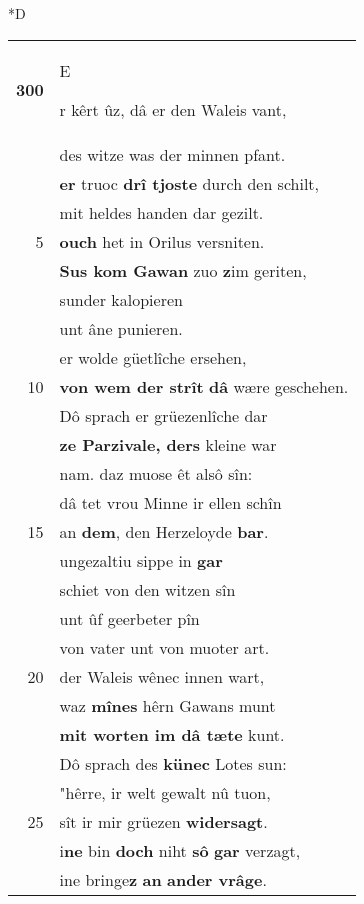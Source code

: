 \documentclass[8pt,a4paper,notitlepage]{article}
\begin{document}
\begin{table}[ht]
\begin{minipage}[t]{0.5\linewidth}
\small
\begin{center}*D
\end{center}
\begin{tabular}{rl}
\textbf{300} & \begin{large}E\end{large}r kêrt ûz, dâ er den Waleis vant,\\ 
 & des witze was der minnen pfant.\\ 
 & \textbf{er} truoc \textbf{drî tjoste} durch den schilt,\\ 
 & mit heldes handen dar gezilt.\\ 
5 & \textbf{ouch} het in Orilus versniten.\\ 
 & \textbf{Sus kom Gawan} zuo \textbf{z}im geriten,\\ 
 & sunder kalopieren\\ 
 & unt âne punieren.\\ 
 & er wolde güetlîche ersehen,\\ 
10 & \textbf{von wem der strît} \textbf{dâ} wære geschehen.\\ 
 & Dô sprach er grüezenlîche dar\\ 
 & \textbf{ze Parzivale, der}\textbf{s} kleine war\\ 
 & nam. daz muose êt alsô sîn:\\ 
 & dâ tet vrou Minne ir ellen schîn\\ 
15 & an \textbf{dem}, den Herzeloyde \textbf{bar}.\\ 
 & ungezaltiu sippe in \textbf{gar}\\ 
 & schiet von den witzen sîn\\ 
 & unt ûf geerbeter pîn\\ 
 & von vater unt von muoter art.\\ 
20 & der Waleis wênec innen wart,\\ 
 & waz \textbf{mînes} hêrn Gawans munt\\ 
 & \textbf{mit worten im dâ tæte} kunt.\\ 
 & Dô sprach des \textbf{künec} Lotes sun:\\ 
 & "hêrre, ir welt gewalt nû tuon,\\ 
25 & sît ir mir grüezen \textbf{widersagt}.\\ 
 & i\textbf{ne} bin \textbf{doch} niht \textbf{sô} \textbf{gar} verzagt,\\ 
 & ine bringe\textbf{z} \textbf{an} \textbf{ander vrâge}.\\ 

\end{tabular}
\end{minipage}
\end{table}
\end{document}
